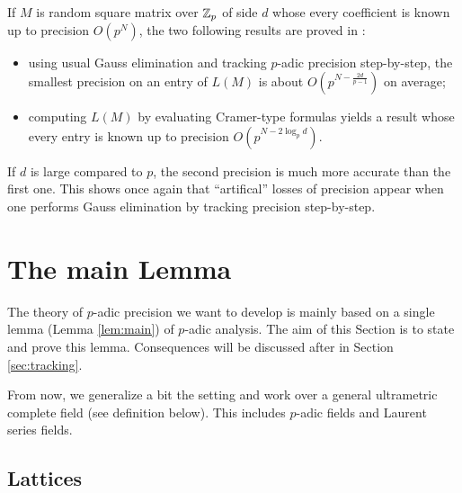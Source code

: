 \documentclass{lms}
\begin{document}
If $M$ is random square matrix over $\mathbb Z_p$ of side $d$ whose every
coefficient is known up to precision $O(p^N)$, the two following
results are proved in \cite{Caruso}:
\begin{itemize}
\item using usual Gauss elimination and tracking $p$-adic precision 
step-by-step, the smallest precision on an entry of $L(M)$ is about
$O(p^{N - \frac{2d}{p-1}})$ on average;
\item computing $L(M)$ by evaluating Cramer-type formulas yields a
result whose every entry is known up to precision $O(p^{N - 2 \log_p 
d})$.
\end{itemize}
If $d$ is large compared to $p$, the second precision is much more
accurate than the first one. This shows once again that ``artifical''
losses of precision appear when one performs Gauss elimination by
tracking precision step-by-step.


\section{The main Lemma}
\label{sec:mainlemma}

The theory of $p$-adic precision we want to develop is mainly based on a 
single lemma (Lemma \ref{lem:main}) of $p$-adic analysis. The aim of 
this Section is to state and prove this lemma. Consequences will be 
discussed after in Section \ref{sec:tracking}.

From now, we generalize a bit the setting and work over a general 
ultrametric complete field (see definition below). This includes 
$p$-adic fields and Laurent series fields.

\subsection{Lattices}
\end{document}
